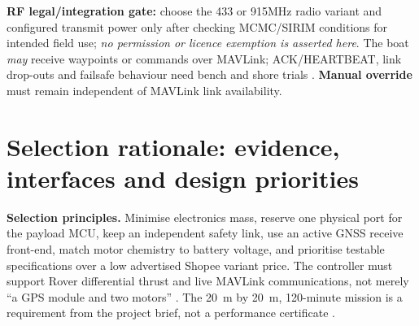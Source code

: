 \normalsize
\textbf{RF legal/integration gate:} choose the 433 or 915MHz radio variant and configured transmit power only after checking MCMC/SIRIM conditions for intended field use; \emph{no permission or licence exemption is asserted here}. The boat \emph{may} receive waypoints or commands over MAVLink; ACK/HEARTBEAT, link drop-outs and failsafe behaviour need bench and shore trials \cite{radioConfig,radioDoc,mav}. \textbf{Manual override} must remain independent of MAVLink link availability.



\section{Selection rationale: evidence, interfaces and design priorities}
\label{sec:selection}
\textbf{Selection principles.} Minimise electronics mass, reserve one physical port for the payload MCU, keep an independent safety link, use an active GNSS receive front-end, match motor chemistry to battery voltage, and prioritise testable specifications over a low advertised Shopee variant price. The controller must support Rover differential thrust and live MAVLink communications, not merely ``a GPS module and two motors'' \cite{coreDoc,boat,motor,mav}. The 20~m by 20~m, 120-minute mission is a requirement from the project brief, not a performance certificate \cite{project}.

